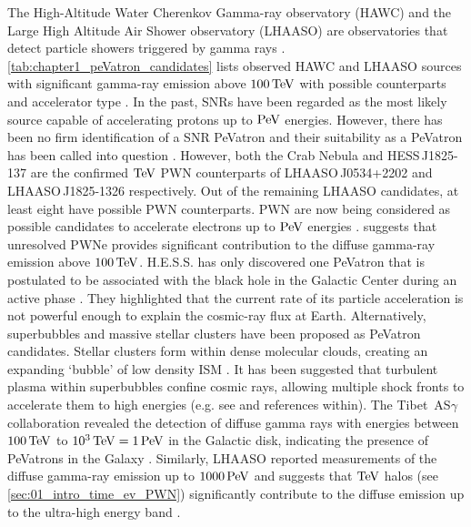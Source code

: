 The High-Altitude Water Cherenkov Gamma-ray observatory (HAWC) and the Large High Altitude Air Shower observatory (LHAASO) are observatories that detect particle showers triggered by gamma rays \citep{LHAASO_website, HAWC}. \autoref{tab:chapter1_peVatron_candidates} lists observed HAWC and LHAASO sources with significant gamma-ray emission above $100\,\TeV$ with possible counterparts and accelerator type \citep{PhysRevLett.124.021102,2021Natur.594...33C}. In the past, SNRs have been regarded as the most likely source capable of accelerating protons up to $\PeV$ energies. However, there has been no firm identification of a SNR PeVatron and their suitability as a PeVatron has been called into question \citep{10.1093/mnras/sty1589,2019IJMPD..2830022G,2021Univ....7..324C,2022MNRAS.516..492B}. However, both the Crab Nebula and \mbox{HESS\,J1825-137} are the confirmed $\TeV$ PWN counterparts of \mbox{LHAASO\,J0534+2202} and \mbox{LHAASO\,J1825-1326} respectively. Out of the remaining LHAASO candidates, at least eight have possible PWN counterparts. PWN are now being considered as possible candidates to accelerate electrons up to $\PeV$ energies \citep{2021ApJ...908L..49B,de_O_a_Wilhelmi_2022}. \cite{2022ApJ...928...19V} suggests that unresolved PWNe provides significant contribution to the diffuse gamma-ray emission above $100\,\TeV$.
\newpar
H.E.S.S. has only discovered one PeVatron that is postulated to be associated with the black hole in the Galactic Center during an active phase \citep{2016Natur.531..476H}. They highlighted that the current rate of its particle acceleration is not powerful enough to explain the cosmic-ray flux at Earth.  Alternatively, superbubbles and massive stellar clusters have been proposed as PeVatron candidates. Stellar clusters form within dense molecular clouds, creating an expanding `bubble' of low density ISM \citep{1998LNP...506..399I}. It has been suggested that turbulent plasma within superbubbles confine cosmic rays, allowing multiple shock fronts to accelerate them to high energies (e.g. see \cite{2022MNRAS.515.2256V} and references within).
\newpar 
The \mbox{Tibet AS$\gamma$} collaboration revealed the detection of diffuse gamma rays with energies between $100\,\TeV$ to $10^3\,\TeV=1\,\PeV$ in the Galactic disk, indicating the presence of PeVatrons in the Galaxy \citep{PhysRevLett.126.141101}. Similarly, LHAASO reported measurements of the diffuse gamma-ray emission up to $1000\,\PeV$ and suggests that $\TeV$ halos (see \autoref{sec:01_intro_time_ev_PWN}) significantly contribute to the diffuse emission up to the ultra-high energy band \citep{2023arXiv230505372C}.

